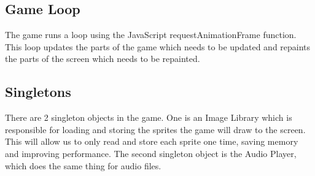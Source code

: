 \subsection*{Game Loop}
The game runs a loop using the JavaScript requestAnimationFrame function. This loop updates the parts 
of the game which needs to be updated and repaints the parts of the screen which needs to be repainted.

\subsection*{Singletons}
There are 2 singleton objects in the game. One is an Image Library which is responsible for loading 
and storing the sprites the game will draw to the screen. This will allow us to only read and store 
each sprite one time, saving memory and improving performance. The second singleton object is the 
Audio Player, which does the same thing for audio files.